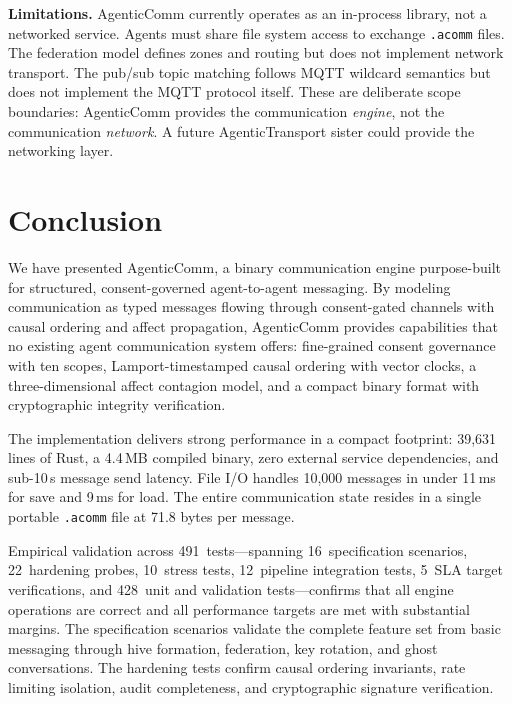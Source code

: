 \documentclass[10pt, twocolumn]{article}
\begin{document}
\textbf{Limitations.} AgenticComm currently operates as an in-process library, not a networked service. Agents must share file system access to exchange \texttt{.acomm} files. The federation model defines zones and routing but does not implement network transport. The pub/sub topic matching follows MQTT wildcard semantics but does not implement the MQTT protocol itself. These are deliberate scope boundaries: AgenticComm provides the communication \emph{engine}, not the communication \emph{network}. A future AgenticTransport sister could provide the networking layer.


\section{Conclusion}
\label{sec:conclusion}

We have presented AgenticComm, a binary communication engine purpose-built for structured, consent-governed agent-to-agent messaging. By modeling communication as typed messages flowing through consent-gated channels with causal ordering and affect propagation, AgenticComm provides capabilities that no existing agent communication system offers: fine-grained consent governance with ten scopes, Lamport-timestamped causal ordering with vector clocks, a three-dimensional affect contagion model, and a compact binary format with cryptographic integrity verification.

The implementation delivers strong performance in a compact footprint: 39{,}631 lines of Rust, a 4.4\,MB compiled binary, zero external service dependencies, and sub-10\,\textmu{}s message send latency. File I/O handles 10{,}000 messages in under 11\,ms for save and 9\,ms for load. The entire communication state resides in a single portable \texttt{.acomm} file at 71.8 bytes per message.

Empirical validation across 491~tests---spanning 16~specification scenarios, 22~hardening probes, 10~stress tests, 12~pipeline integration tests, 5~SLA target verifications, and 428~unit and validation tests---confirms that all engine operations are correct and all performance targets are met with substantial margins. The specification scenarios validate the complete feature set from basic messaging through hive formation, federation, key rotation, and ghost conversations. The hardening tests confirm causal ordering invariants, rate limiting isolation, audit completeness, and cryptographic signature verification.
\end{document}
